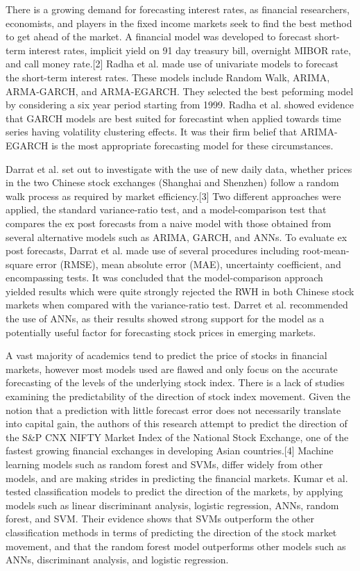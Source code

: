 \documentclass[times]{jtitauth}
\begin{document}
There is a growing demand for forecasting interest rates, as financial researchers, economists, and players in the fixed income markets seek to find the best method to get ahead of the market. A financial model was developed to forecast short-term interest rates, implicit yield on 91 day treasury bill, overnight MIBOR rate, and call money rate.[2] Radha et al. made use of univariate models to forecast the short-term interest rates. These models include Random Walk, ARIMA, ARMA-GARCH, and ARMA-EGARCH. They selected the best peforming model by considering a six year period starting from 1999. Radha et al. showed evidence that GARCH models are best suited for forecastint when applied towards time series having volatility clustering effects. It was their firm belief that ARIMA-EGARCH is the most appropriate forecasting model for these circumstances.

Darrat et al. set out to investigate with the use of new daily data, whether prices in the two Chinese stock exchanges (Shanghai and Shenzhen) follow a random walk process as required by market efficiency.[3] Two different approaches were applied, the standard variance-ratio test, and a model-comparison test that compares the ex post forecasts from a naive model with those obtained from several alternative models such as ARIMA, GARCH, and ANNs. To evaluate ex post forecasts, Darrat et al. made use of several procedures including root-mean-square error (RMSE), mean absolute error (MAE), uncertainty coefficient, and encompassing tests. It was concluded that the model-comparison approach yielded results which were quite strongly rejected the RWH in both Chinese stock markets when compared with the variance-ratio test. Darret et al. recommended the use of ANNs, as their results showed strong support for the model as a potentially useful factor for forecasting stock prices in emerging markets.

A vast majority of academics tend to predict the price of stocks in financial markets, however most models used are flawed and only focus on the accurate forecasting of the levels of the underlying stock index. There is a lack of studies examining the predictability of the direction of stock index movement. Given the notion that a prediction with little forecast error does not necessarily translate into capital gain, the authors of this research attempt to predict the direction of the S\&P CNX NIFTY Market Index of the National Stock Exchange, one of the fastest growing financial exchanges in developing Asian countries.[4] Machine learning models such as random forest and SVMs, differ widely from other models, and are making strides in predicting the financial markets. Kumar et al. tested classification models to predict the direction of the markets, by applying models such as linear discriminant analysis, logistic regression, ANNs, random forest, and SVM. Their evidence shows that SVMs outperform the other classification methods in terms of predicting the direction of the stock market movement, and that the random forest model outperforms other models such as ANNs, discriminant analysis, and logistic regression.
\end{document}
